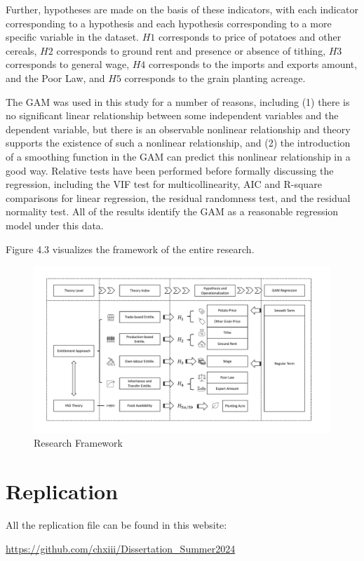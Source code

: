 Further, hypotheses are made on the basis of these indicators, with each indicator corresponding to a hypothesis and each hypothesis corresponding to a more specific variable in the dataset. $H1$ corresponds to price of potatoes and other cereals, $H2$ corresponds to ground rent and presence or absence of tithing, $H3$ corresponds to general wage, $H4$ corresponds to the imports and exports amount, and the Poor Law, and $H5$ corresponds to the grain planting acreage.

The GAM was used in this study for a number of reasons, including (1) there is no significant linear relationship between some independent variables and the dependent variable, but there is an observable nonlinear relationship and theory supports the existence of such a nonlinear relationship, and (2) the introduction of a smoothing function in the GAM can predict this nonlinear relationship in a good way. Relative tests have been performed before formally discussing the regression, including the VIF test for multicollinearity, AIC and R-square comparisons for linear regression, the residual randomness test, and the residual normality test. All of the results identify the GAM as a reasonable regression model under this data.

Figure 4.3 visualizes the framework of the entire research.

\begin{landscape}
    \begin{figure}[h]
        \centering
        \caption{Research Framework}
        \includegraphics[width=1.5\textheight]{../03_outputs/Framework.pdf}
    \end{figure}
\end{landscape}

\section{Replication}
All the replication file can be found in this website:

\url{https://github.com/chxiii/Dissertation_Summer2024}



